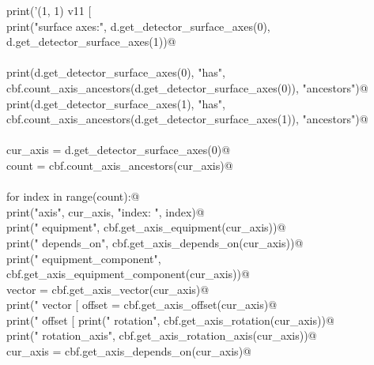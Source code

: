 \documentclass[10pt,a4paper,twoside,notitlepage]{article}
\begin{document}
\begin{flushleft}
\begin{minipage}{\linewidth}
\begin{list}{}{}
\mbox{}\verb@    print('(1, 1) v11 [ %.9g %.9g %.9g ]' %(round(v11[0],9), round(v11[1],9), round(v11[2],9)))@\\
\mbox{}\verb@@\\
\mbox{}\verb@    print("surface axes:",  d.get_detector_surface_axes(0), d.get_detector_surface_axes(1))@\\
\mbox{}\verb@@\\
\mbox{}\verb@    print(d.get_detector_surface_axes(0), "has", cbf.count_axis_ancestors(d.get_detector_surface_axes(0)), "ancestors")@\\
\mbox{}\verb@    print(d.get_detector_surface_axes(1), "has", cbf.count_axis_ancestors(d.get_detector_surface_axes(1)), "ancestors")@\\
\mbox{}\verb@@\\
\mbox{}\verb@    cur_axis = d.get_detector_surface_axes(0)@\\
\mbox{}\verb@    count = cbf.count_axis_ancestors(cur_axis)@\\
\mbox{}\verb@@\\
\mbox{}\verb@    for index in range(count):@\\
\mbox{}\verb@        print("axis", cur_axis, "index: ", index)@\\
\mbox{}\verb@        print("    equipment", cbf.get_axis_equipment(cur_axis))@\\
\mbox{}\verb@        print("    depends_on", cbf.get_axis_depends_on(cur_axis))@\\
\mbox{}\verb@        print("    equipment_component", cbf.get_axis_equipment_component(cur_axis))@\\
\mbox{}\verb@        vector = cbf.get_axis_vector(cur_axis)@\\
\mbox{}\verb@        print("    vector [ %.8g %.8g %.8g ]" % (round(vector[0],7), round(vector[1],7), round(vector[2],7)))@\\
\mbox{}\verb@        offset = cbf.get_axis_offset(cur_axis)@\\
\mbox{}\verb@        print("    offset [ %.8g %.8g %.8g ]" % (round(offset[0],7), round(offset[1],7), round(offset[2],7)))@\\
\mbox{}\verb@        print("    rotation", cbf.get_axis_rotation(cur_axis))@\\
\mbox{}\verb@        print("    rotation_axis", cbf.get_axis_rotation_axis(cur_axis))@\\
\mbox{}\verb@        cur_axis = cbf.get_axis_depends_on(cur_axis)@\\
\mbox{}\verb@@{\NWsep}
\end{list}
\vspace{-1.5ex}
\footnotesize
\begin{list}{}{\setlength{\itemsep}{-\parsep}\setlength{\itemindent}{-\leftmargin}}

\item{}
\end{list}
\end{minipage}\vspace{4ex}
\end{flushleft}
\end{document}
